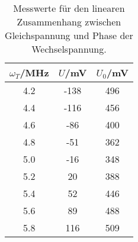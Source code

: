 \begin{table}
\centering
\caption{Messwerte für den linearen Zusammenhang zwischen Gleichspannung und Phase der Wechselspannung.}
\begin{tabular}{ccc}
$\omega_T$/MHz &  $U$/mV &  $U_0$/mV \\
\midrule
         4.2 &  -138 &     496 \\
         4.4 &  -116 &     456 \\
         4.6 &   -86 &     400 \\
         4.8 &   -51 &     362 \\
         5.0 &   -16 &     348 \\
         5.2 &    20 &     388 \\
         5.4 &    52 &     446 \\
         5.6 &    89 &     488 \\
         5.8 &   116 &     509 \\
\end{tabular}
\label{tab:e}
\end{table}
